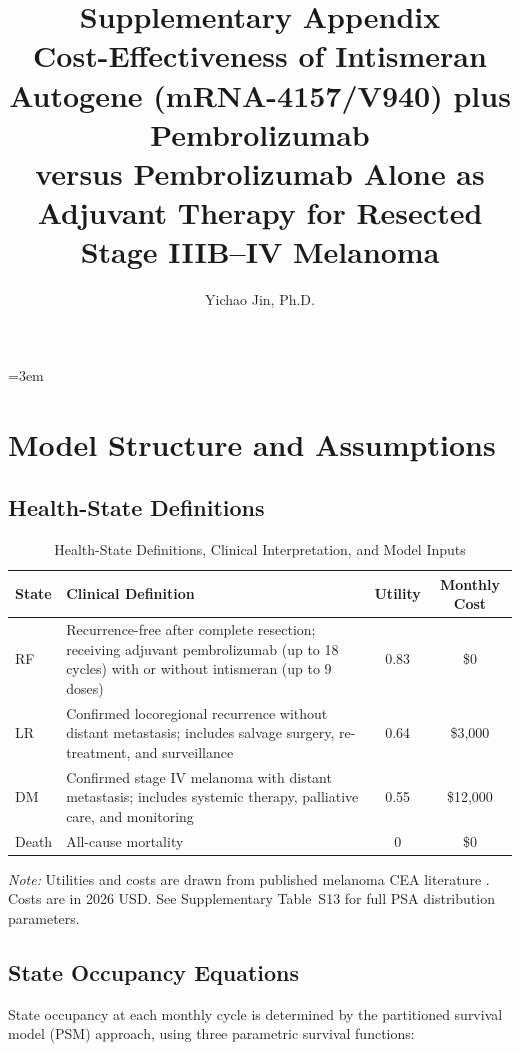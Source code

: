 \documentclass[11pt,a4paper]{article}
\title{Supplementary Appendix\\
\large Cost-Effectiveness of Intismeran Autogene (mRNA-4157/V940) plus Pembrolizumab\\
versus Pembrolizumab Alone as Adjuvant Therapy for Resected Stage IIIB--IV Melanoma}
\author{Yichao Jin, Ph.D.}
\date{}
\begin{document}
\emergencystretch=3em
\hfuzz=1pt
\maketitle
\tableofcontents
\newpage

\section{Model Structure and Assumptions}

\subsection{Health-State Definitions}
\label{sec:s1}
\begin{table}[H]
\centering
\caption{Health-State Definitions, Clinical Interpretation, and Model Inputs}
\label{tab:s1}
\begin{tabular}{lp{5cm}cc}
\toprule
\textbf{State} & \textbf{Clinical Definition} & \textbf{Utility} & \textbf{Monthly Cost} \\
\midrule
RF & Recurrence-free after complete resection; receiving adjuvant \mbox{pembrolizumab} (up to 18 cycles) with or without intismeran (up to 9 doses) & 0.83 & \$0 \\
LR & Confirmed locoregional recurrence without distant metastasis; includes salvage surgery, re-treatment, and surveillance & 0.64 & \$3,000 \\
DM & Confirmed stage IV melanoma with distant metastasis; includes systemic therapy, palliative care, and monitoring & 0.55 & \$12,000 \\
Death & All-cause mortality & 0 & \$0 \\
\bottomrule
\end{tabular}
\end{table}
\noindent\textit{Note:} Utilities and costs are drawn from published melanoma CEA literature \cite{bensimon2019, johnston2021, zhang2023}. Costs are in 2026 USD. See Supplementary Table~S13 for full PSA distribution parameters.

\subsection{State Occupancy Equations}
\label{sec:s2}
State occupancy at each monthly cycle is determined by the partitioned survival model (PSM) approach, using three parametric survival functions:
\end{document}
